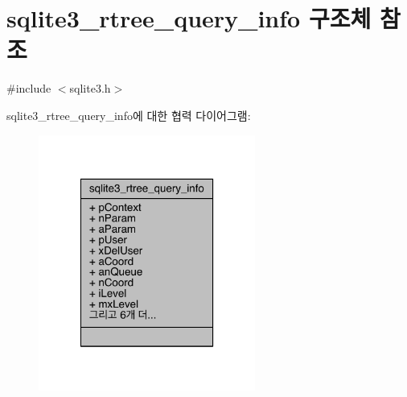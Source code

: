 \hypertarget{structsqlite3__rtree__query__info}{}\section{sqlite3\+\_\+rtree\+\_\+query\+\_\+info 구조체 참조}
\label{structsqlite3__rtree__query__info}


{\ttfamily \#include $<$sqlite3.\+h$>$}



sqlite3\+\_\+rtree\+\_\+query\+\_\+info에 대한 협력 다이어그램\+:
\nopagebreak
\begin{figure}[H]
\begin{center}
\leavevmode
\includegraphics[width=202pt]{structsqlite3__rtree__query__info__coll__graph}
\end{center}
\end{figure}
